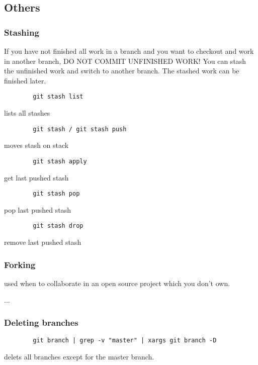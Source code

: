 \documentclass[12pt, twoside]{article}
\begin{document}
	\subsection{Others}
	
	\subsubsection{Stashing}
	
	If you have not finished all work in a branch and you want to checkout and work in another branch, DO NOT COMMIT UNFINISHED WORK! You can stash the unfinished work and switch to another branch. The stashed work can be finished later.
	
	\begin{verbatim}
		git stash list
	\end{verbatim}
	lists all stashes
	
	\begin{verbatim}
		git stash / git stash push
	\end{verbatim}
	moves stash on stack
	
	\begin{verbatim}
		git stash apply
	\end{verbatim}
	get last pushed stash
	
	\begin{verbatim}
		git stash pop
	\end{verbatim}
	pop last pushed stash
	
	\begin{verbatim}
		git stash drop
	\end{verbatim}
	remove last pushed stash
	
	\subsubsection{Forking}
	
	used when to collaborate in an open source project which you don't own.
	
	...
	
	\subsubsection{Deleting branches}
	
	\begin{verbatim}
		git branch | grep -v "master" | xargs git branch -D
	\end{verbatim}
	delets all branches except for the master branch.
\end{document}
